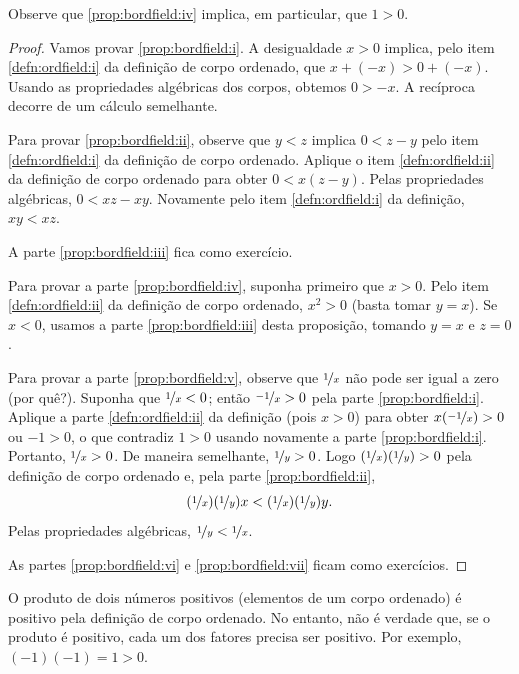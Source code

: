 Observe que \ref{prop:bordfield:iv} implica, em particular, que $1 > 0$.

\begin{proof}
Vamos provar \ref{prop:bordfield:i}. A desigualdade $x > 0$ implica, pelo item
\ref{defn:ordfield:i} da definição de corpo ordenado, que
$x + (-x) > 0 + (-x)$. Usando as propriedades algébricas dos corpos,
obtemos $0 > -x$. A recíproca decorre de um cálculo semelhante.

Para provar \ref{prop:bordfield:ii}, observe que $y < z$ implica
$0 < z - y$ pelo
item \ref{defn:ordfield:i} da definição de corpo ordenado.
Aplique o item
\ref{defn:ordfield:ii} da definição de corpo ordenado para obter
$0 < x(z-y)$. Pelas propriedades algébricas, $0 < xz - xy$.
Novamente pelo item \ref{defn:ordfield:i} da definição, $xy < xz$.

A parte \ref{prop:bordfield:iii} fica como exercício.

Para provar a parte \ref{prop:bordfield:iv}, suponha primeiro que $x > 0$.
Pelo item \ref{defn:ordfield:ii} da definição de corpo ordenado,
$x^2 > 0$ (basta tomar $y=x$). Se $x < 0$, usamos
a parte \ref{prop:bordfield:iii} desta proposição, tomando $y=x$ e
$z=0$.

Para provar a parte \ref{prop:bordfield:v}, observe que
$\nicefrac{1}{x}$ não pode ser igual a zero (por quê?).
Suponha que $\nicefrac{1}{x} < 0$;
então $\nicefrac{-1}{x} > 0$ pela parte \ref{prop:bordfield:i}.
Aplique a parte \ref{defn:ordfield:ii} da definição (pois $x > 0$) para obter
$x(\nicefrac{-1}{x}) > 0$ ou $-1 > 0$, o que contradiz $1 > 0$ usando novamente a parte
\ref{prop:bordfield:i}. Portanto, $\nicefrac{1}{x} > 0$.
De maneira semelhante, $\nicefrac{1}{y} > 0$. Logo $(\nicefrac{1}{x})(\nicefrac{1}{y}) > 0$
pela definição de corpo ordenado e, pela parte \ref{prop:bordfield:ii},
\begin{equation*}
(\nicefrac{1}{x})(\nicefrac{1}{y})x < (\nicefrac{1}{x})(\nicefrac{1}{y})y .
\end{equation*}
Pelas propriedades algébricas, $\nicefrac{1}{y} < \nicefrac{1}{x}$.

As partes \ref{prop:bordfield:vi} e \ref{prop:bordfield:vii} ficam como
exercícios.
\end{proof}

O produto de dois números positivos (elementos de um corpo ordenado) é positivo
pela definição de corpo ordenado.
No entanto, não é verdade que, se o produto é positivo, cada um dos fatores
precisa ser positivo. Por exemplo, $(-1)(-1) = 1 > 0$.

